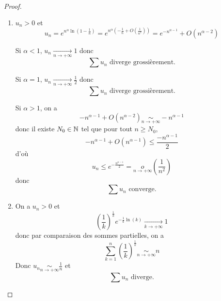 \documentclass[12pt]{article}
\begin{document}
\begin{proof}
	\phantom{}
	\begin{enumerate}
		\item $u_{n}>0$ et 
		\begin{equation}u_{n}=e^{n^{\alpha}\ln\left(1-\frac{1}{n}\right)}=e^{n^{\alpha}\left(-\frac{1}{n}+O\left(\frac{1}{n^{2}}\right)\right)}=e^{-n^{\alpha-1}}+O\left(n^{\alpha-2}\right)\end{equation}

		Si $\alpha<1$, $u_{n}\xrightarrow[n\to+\infty]{}1$ donc 
		\begin{equation}\boxed{\sum u_{n}\text{ diverge grossièrement.}}\end{equation}

		Si $\alpha=1$, $u_{n}\xrightarrow[n\to+\infty]{}\frac{1}{2}$ donc 
		\begin{equation}\boxed{\sum u_{n}\text{ diverge grossièrement.}}\end{equation}

		Si $\alpha>1$, on a 
		\begin{equation}-n^{\alpha-1}+O\left(n^{\alpha-2}\right)\underset{n\to+\infty}{\sim}-n^{\alpha-1}\end{equation}
		donc il existe $N_{0}\in\mathbb{N}$ tel que pour tout $n\geqslant N_{0}$,
		\begin{equation}-n^{\alpha-1}+O\left(n^{\alpha-1}\right)\leqslant\frac{-n^{\alpha-1}}{2}\end{equation}
		d'où 
		\begin{equation}u_{n}\leqslant e^{-\frac{n^{\alpha-1}}{2}}=\underset{n\to+\infty}{o}\left(\frac{1}{n^{2}}\right)\end{equation}
		donc 
		\begin{equation}\boxed{\sum u_{n}\text{ converge.}}\end{equation}

		\item On a $u_{n}>0$ et 
		\begin{equation}\left(\frac{1}{k}\right)^{\frac{1}{k}}e^{-\frac{1}{k}\ln(k)}\xrightarrow[k\to+\infty]{}1\end{equation}
		donc par comparaison des sommes partielles, on a 
		\begin{equation}\sum_{k=1}^{n}\left(\frac{1}{k}\right)^{\frac{1}{k}}\underset{n\to+\infty}{\sim}n\end{equation}
		Donc $u_{n}\underset{n\to+\infty}{\sim}\frac{1}{n}$ et 
		\begin{equation}\boxed{\sum u_{n}\text{ diverge.}}\end{equation}


\end{enumerate}
\end{proof}
\end{document}
